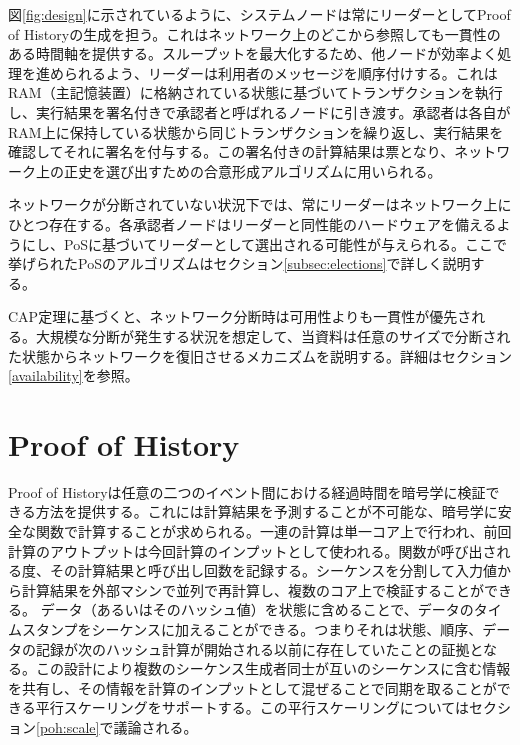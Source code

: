 \documentclass[12pt]{ltjsarticle}
\begin{document}
図\ref{fig:design}に示されているように、システムノードは常にリーダーとしてProof of Historyの生成を担う。これはネットワーク上のどこから参照しても一貫性のある時間軸を提供する。スループットを最大化するため、他ノードが効率よく処理を進められるよう、リーダーは利用者のメッセージを順序付けする。これはRAM（主記憶装置）に格納されている状態に基づいてトランザクションを執行し、実行結果を署名付きで承認者と呼ばれるノードに引き渡す。承認者は各自がRAM上に保持している状態から同じトランザクションを繰り返し、実行結果を確認してそれに署名を付与する。この署名付きの計算結果は票となり、ネットワーク上の正史を選び出すための合意形成アルゴリズムに用いられる。

ネットワークが分断されていない状況下では、常にリーダーはネットワーク上にひとつ存在する。各承認者ノードはリーダーと同性能のハードウェアを備えるようにし、PoSに基づいてリーダーとして選出される可能性が与えられる。ここで挙げられたPoSのアルゴリズムはセクション\ref{subsec:elections}で詳しく説明する。

CAP定理に基づくと、ネットワーク分断時は可用性よりも一貫性が優先される。大規模な分断が発生する状況を想定して、当資料は任意のサイズで分断された状態からネットワークを復旧させるメカニズムを説明する。詳細はセクション\ref{availability}を参照。

\section{Proof of History}\label{proof_of_history}
Proof of Historyは任意の二つのイベント間における経過時間を暗号学に検証できる方法を提供する。これには計算結果を予測することが不可能な、暗号学に安全な関数で計算することが求められる。一連の計算は単一コア上で行われ、前回計算のアウトプットは今回計算のインプットとして使われる。関数が呼び出される度、その計算結果と呼び出し回数を記録する。シーケンスを分割して入力値から計算結果を外部マシンで並列で再計算し、複数のコア上で検証することができる。
データ（あるいはそのハッシュ値）を状態に含めることで、データのタイムスタンプをシーケンスに加えることができる。つまりそれは状態、順序、データの記録が次のハッシュ計算が開始される以前に存在していたことの証拠となる。この設計により複数のシーケンス生成者同士が互いのシーケンスに含む情報を共有し、その情報を計算のインプットとして混ぜることで同期を取ることができる平行スケーリングをサポートする。この平行スケーリングについてはセクション\ref{poh:scale}で議論される。
\end{document}
